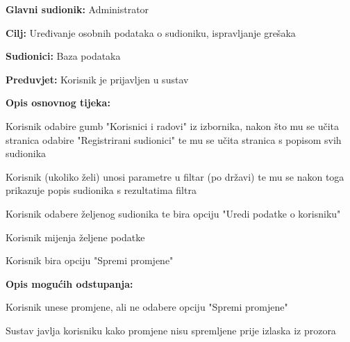 					\noindent {}
					\begin{packed_item}
						\item \textbf{Glavni sudionik:} Administrator
						\item \textbf{Cilj:} Uređivanje osobnih podataka o sudioniku, ispravljanje grešaka
						\item \textbf{Sudionici:} Baza podataka
						\item \textbf{Preduvjet:} Korisnik je prijavljen u sustav
						
						\item \textbf{Opis osnovnog tijeka:} 
						\item[] \begin{packed_enum}
							\item Korisnik odabire gumb "Korisnici i radovi" iz izbornika, nakon što mu se učita stranica odabire "Registrirani sudionici" te mu se učita stranica s popisom svih sudionika
							\item Korisnik (ukoliko želi) unosi parametre u filtar (po državi) te mu se nakon toga prikazuje popis sudionika s rezultatima filtra
							\item Korisnik odabere željenog sudionika te bira opciju "Uredi podatke o korisniku"
							\item Korisnik mijenja željene podatke
							\item Korisnik bira opciju "Spremi promjene"
						\end{packed_enum}
					
						\item \textbf{Opis mogućih odstupanja:}
						\item[] \begin{packed_enum}

							\item[2.a] Korisnik unese promjene, ali ne odabere opciju "Spremi promjene"
							\item[] \begin{packed_enum}
								\item[1.] Sustav javlja korisniku kako promjene nisu spremljene prije izlaska iz prozora
							\end{packed_enum}
						\end{packed_enum}
					\end{packed_item}

